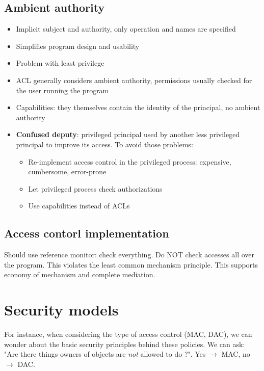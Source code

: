 \documentclass{article}
\newenvironment{myitemize}
{ \begin{itemize}
    \setlength{\itemsep}{005pt}
    \setlength{\parskip}{0pt}
    \setlength{\parsep}{0pt}     }
{ \end{itemize}                  }
\begin{document}
\begin{multicols}{2}
\subsection{Ambient authority}

\begin{myitemize}
    \item Implicit subject and authority, only operation and names are specified
    \item Simplifies program design and usability
    \item Problem with least privilege 
    \item ACL generally considers ambient authority, permissions usually checked for the user running the program
    \item Capabilities: they themselves contain the identity of the principal, no ambient authority
    \item \textbf{Confused deputy}: privileged principal used by another less privileged principal to improve its access. To avoid those problems:
    \begin{myitemize}
        \item Re-implement access control in the privileged process: expensive, cumbersome, error-prone
        \item Let privileged process check authorizations 
        \item Use capabilities instead of ACLs
    \end{myitemize}
\end{myitemize}


\subsection{Access contorl implementation}

Should use reference monitor: check everything. Do NOT check accesses all over the program. This violates the least common mechanism principle. This supports economy of mechanism and complete mediation. 



\section{Security models}

For instance, when considering the type of access control (MAC, DAC), we can wonder about the basic security principles behind these policies. We can ask: "Are there things owners of objects are \emph{not} allowed to do ?". Yes $\rightarrow$ MAC, no $\rightarrow$ DAC. 


\end{multicols}
\end{document}

